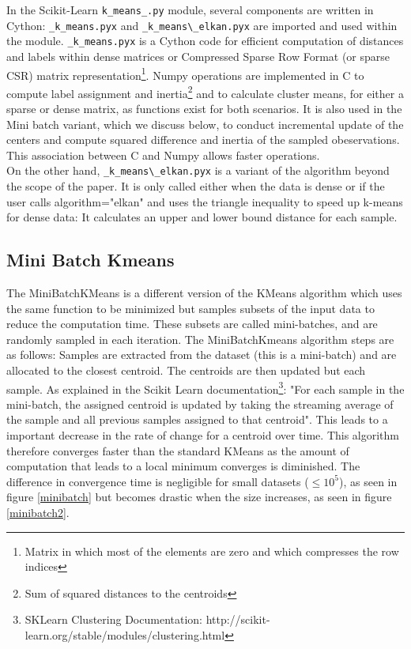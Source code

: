 \documentclass[11pt]{article}
\begin{document}
\noindent In the Scikit-Learn \verb|k_means_.py| module, several components are written in Cython: \verb|_k_means.pyx| and \verb|_k_means\_elkan.pyx| are imported and used within the module. \verb|_k_means.pyx| is a Cython code for efficient computation of distances and labels within dense matrices or Compressed Sparse Row Format (or sparse CSR) matrix representation\footnote{Matrix in which most of the elements are zero and which compresses the row indices}. Numpy operations are implemented in C to compute label assignment and inertia\footnote{Sum of squared distances to the centroids} and to calculate cluster means, for either a sparse or dense matrix, as functions exist for both scenarios. It is also used in the Mini batch variant, which we discuss below, to conduct incremental update of the centers and compute squared difference and inertia of the sampled obeservations. This association between C and Numpy allows faster operations.\\

\noindent On the other hand, \verb|_k_means\_elkan.pyx| is a variant of the algorithm beyond the scope of the paper. It is only called either when the data is dense or if the user calls algorithm="elkan" and uses the triangle inequality to speed up k-means for dense data: It calculates an upper and lower bound distance for each sample. 

\subsection*{Mini Batch Kmeans}
The MiniBatchKMeans is a different version of the KMeans algorithm which uses the same function to be minimized but samples subsets of the input data to reduce the computation time. These subsets are called mini-batches, and are randomly sampled in each iteration. The MiniBatchKmeans algorithm steps are as follows: Samples are extracted from the dataset (this is a mini-batch) and are allocated to the closest centroid. The centroids are then updated but each sample. As explained in the Scikit Learn documentation\footnote{SKLearn Clustering Documentation: http://scikit-learn.org/stable/modules/clustering.html}:
"For each sample in the mini-batch, the assigned centroid is updated by taking the streaming average of the sample and all previous samples assigned to that centroid". 
This leads to a important decrease in the rate of change for a centroid over time. This algorithm therefore converges faster than the standard KMeans as the amount of computation that leads to a local minimum converges is diminished. The difference in convergence time is negligible for small datasets ($\leq 10^5$), as seen in figure \ref{minibatch} but becomes drastic when the size increases, as seen in figure \ref{minibatch2}.\\
\end{document}
